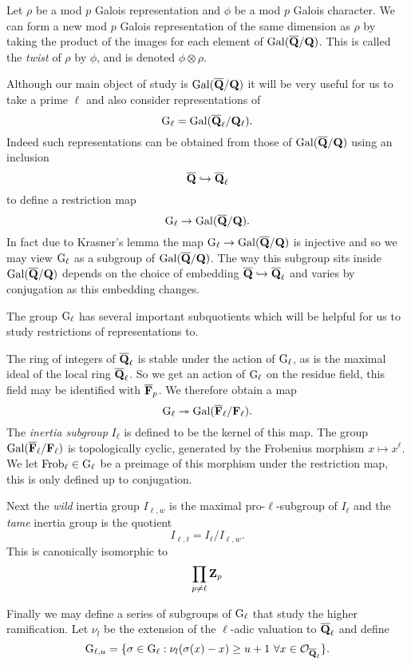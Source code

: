 \documentclass[a4paper,12pt]{article}
\begin{document}
\begin{defn}
Let $\rho$ be a mod $p$ Galois representation and $\phi$ be a mod $p$ Galois character.
We can form a new mod $p$ Galois representation of the same dimension as $\rho$ by taking the product of the images for each element of $\operatorname{Gal}(\overline{\mathbf{Q}}/\mathbf{Q})$.
This is called the \emph{twist} of $\rho$ by $\phi$, and is denoted $\phi\otimes \rho$.
\end{defn}

Although our main object of study is $\operatorname{Gal}(\overline{\mathbf{Q}}/\mathbf{Q})$ it will be very useful for us to take a prime $\ell$ and also consider representations of
\[
\mathrm{G}_\ell = \operatorname{Gal}(\overline{\mathbf{Q}}_\ell/\mathbf{Q}_\ell).
\]
Indeed such representations can be obtained from those of $\operatorname{Gal}(\overline{\mathbf{Q}}/\mathbf{Q})$ using an inclusion
\[
\overline{\mathbf{Q}} \hookrightarrow \overline{\mathbf{Q}}_\ell
\]
to define a restriction map
\[
\mathrm{G}_\ell \to \operatorname{Gal}(\overline{\mathbf{Q}}/\mathbf{Q}).
\]
In fact due to Krasner's lemma \cite[p. 238]{Cohen} the map $\mathrm{G}_\ell \to \operatorname{Gal}(\overline{\mathbf{Q}}/\mathbf{Q})$ is injective and so we may view $\mathrm{G}_\ell$ as a subgroup of $\operatorname{Gal}(\overline{\mathbf{Q}}/\mathbf{Q})$.
The way this subgroup sits inside $\operatorname{Gal}(\overline{\mathbf{Q}}/\mathbf{Q})$ depends on the choice of embedding $\overline{\mathbf{Q}} \hookrightarrow \overline{\mathbf{Q}}_\ell$ and varies by conjugation as this embedding changes.

The group $\mathrm{G}_\ell$ has several important subquotients which will be helpful for us to study restrictions of representations to.
\begin{defn}\label{def:inert}
The ring of integers of $\overline{\mathbf{Q}}_\ell$ is stable under the action of $\mathrm{G}_\ell$, as is the maximal ideal of the local ring $\overline{\mathbf{Q}}_\ell$.
So we get an action of $\mathrm{G}_\ell$ on the residue field, this field may be identified with $\overline{\mathbf{F}}_p$.
We therefore obtain a map %
\[
\mathrm{G}_\ell \twoheadrightarrow \operatorname{Gal}(\overline{\mathbf{F}}_\ell/\mathbf{F}_\ell).
\]
The \emph{inertia subgroup} $I_\ell$ is defined to be the kernel of this map.
The group $\operatorname{Gal}(\overline{\mathbf{F}}_\ell/\mathbf{F}_\ell)$ is topologically cyclic, generated by the Frobenius morphism $x \mapsto x^\ell$.
We let $\operatorname{Frob}_\ell\in \mathrm{G}_\ell$ be a preimage of this morphism under the restriction map, this is only defined up to conjugation.


Next the \emph{wild} inertia group $I_{\ell,w}$ is the maximal pro-$\ell$-subgroup of $I_\ell$ and the \emph{tame} inertia group is the quotient
\[
I_{\ell,t} = I_\ell / I_{\ell,w}.
\]
This is canonically isomorphic to
\[
\prod_{p \ne \ell} \mathbf{Z}_p
\]


Finally we may define a series of subgroups of $\mathrm{G}_\ell$ that study the higher ramification.
Let $\nu_l$ be the extension of the $\ell$-adic valuation to $\overline{\mathbf{Q}}_\ell$ and define
\[
\mathrm{G}_{\ell,u} = \{\sigma \in \mathrm{G}_\ell : \nu_l(\sigma(x) - x) \ge u + 1\ \forall x \in \mathcal{O}_{\overline{\mathbf{Q}}_\ell} \}.
\]
\end{defn}
\end{document}
